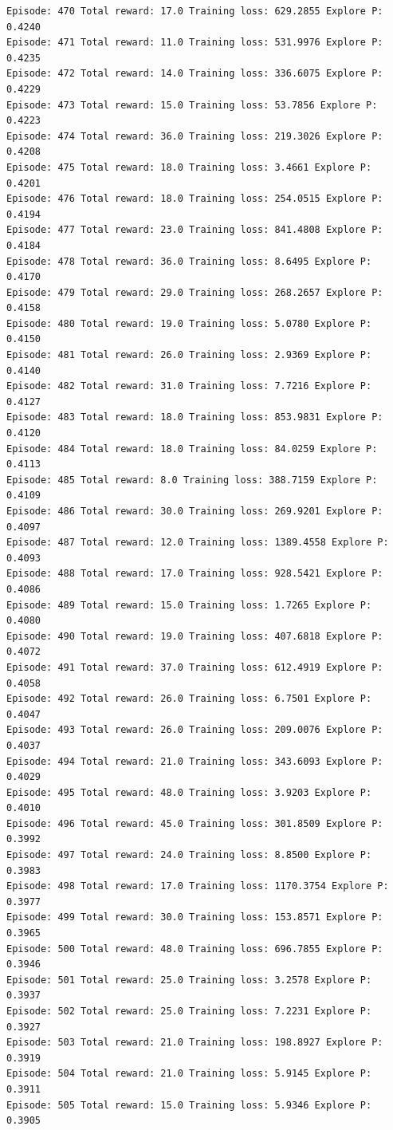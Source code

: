 \documentclass[11pt]{article}
\begin{document}
\begin{Verbatim}[commandchars=\\\{\}]
Episode: 470 Total reward: 17.0 Training loss: 629.2855 Explore P: 0.4240
Episode: 471 Total reward: 11.0 Training loss: 531.9976 Explore P: 0.4235
Episode: 472 Total reward: 14.0 Training loss: 336.6075 Explore P: 0.4229
Episode: 473 Total reward: 15.0 Training loss: 53.7856 Explore P: 0.4223
Episode: 474 Total reward: 36.0 Training loss: 219.3026 Explore P: 0.4208
Episode: 475 Total reward: 18.0 Training loss: 3.4661 Explore P: 0.4201
Episode: 476 Total reward: 18.0 Training loss: 254.0515 Explore P: 0.4194
Episode: 477 Total reward: 23.0 Training loss: 841.4808 Explore P: 0.4184
Episode: 478 Total reward: 36.0 Training loss: 8.6495 Explore P: 0.4170
Episode: 479 Total reward: 29.0 Training loss: 268.2657 Explore P: 0.4158
Episode: 480 Total reward: 19.0 Training loss: 5.0780 Explore P: 0.4150
Episode: 481 Total reward: 26.0 Training loss: 2.9369 Explore P: 0.4140
Episode: 482 Total reward: 31.0 Training loss: 7.7216 Explore P: 0.4127
Episode: 483 Total reward: 18.0 Training loss: 853.9831 Explore P: 0.4120
Episode: 484 Total reward: 18.0 Training loss: 84.0259 Explore P: 0.4113
Episode: 485 Total reward: 8.0 Training loss: 388.7159 Explore P: 0.4109
Episode: 486 Total reward: 30.0 Training loss: 269.9201 Explore P: 0.4097
Episode: 487 Total reward: 12.0 Training loss: 1389.4558 Explore P: 0.4093
Episode: 488 Total reward: 17.0 Training loss: 928.5421 Explore P: 0.4086
Episode: 489 Total reward: 15.0 Training loss: 1.7265 Explore P: 0.4080
Episode: 490 Total reward: 19.0 Training loss: 407.6818 Explore P: 0.4072
Episode: 491 Total reward: 37.0 Training loss: 612.4919 Explore P: 0.4058
Episode: 492 Total reward: 26.0 Training loss: 6.7501 Explore P: 0.4047
Episode: 493 Total reward: 26.0 Training loss: 209.0076 Explore P: 0.4037
Episode: 494 Total reward: 21.0 Training loss: 343.6093 Explore P: 0.4029
Episode: 495 Total reward: 48.0 Training loss: 3.9203 Explore P: 0.4010
Episode: 496 Total reward: 45.0 Training loss: 301.8509 Explore P: 0.3992
Episode: 497 Total reward: 24.0 Training loss: 8.8500 Explore P: 0.3983
Episode: 498 Total reward: 17.0 Training loss: 1170.3754 Explore P: 0.3977
Episode: 499 Total reward: 30.0 Training loss: 153.8571 Explore P: 0.3965
Episode: 500 Total reward: 48.0 Training loss: 696.7855 Explore P: 0.3946
Episode: 501 Total reward: 25.0 Training loss: 3.2578 Explore P: 0.3937
Episode: 502 Total reward: 25.0 Training loss: 7.2231 Explore P: 0.3927
Episode: 503 Total reward: 21.0 Training loss: 198.8927 Explore P: 0.3919
Episode: 504 Total reward: 21.0 Training loss: 5.9145 Explore P: 0.3911
Episode: 505 Total reward: 15.0 Training loss: 5.9346 Explore P: 0.3905

\end{Verbatim}
\end{document}

